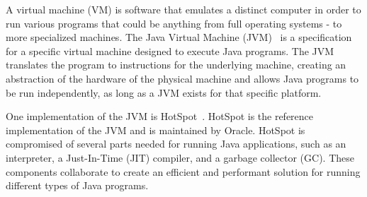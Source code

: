 A virtual machine (VM) is software that emulates a distinct computer in order to run various programs that could be anything from full operating systems - to more specialized machines. The Java Virtual Machine (JVM)~\cite{JVM} is a specification for a specific virtual machine designed to execute Java programs. The JVM translates the program to instructions for the underlying machine, creating an abstraction of the hardware of the physical machine and allows Java programs to be run independently, as long as a JVM exists for that specific platform. 

One implementation of the JVM is HotSpot~\cite{hotspot}. HotSpot is the reference implementation of the JVM and is maintained by Oracle. HotSpot is compromised of several parts needed for running Java applications, such as an interpreter, a Just-In-Time (JIT) compiler, and a garbage collector (GC). These components collaborate to create an efficient and performant solution for running different types of Java programs.

